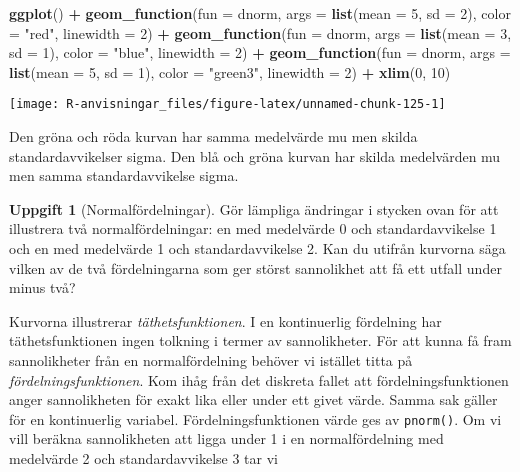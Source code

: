 \documentclass[
]{book}
\newenvironment{Shaded}{\begin{snugshade}}{\end{snugshade}}
\newcommand{\AttributeTok}[1]{\textcolor[rgb]{0.13,0.29,0.53}{#1}}
\newcommand{\DecValTok}[1]{\textcolor[rgb]{0.00,0.00,0.81}{#1}}
\newcommand{\FunctionTok}[1]{\textcolor[rgb]{0.13,0.29,0.53}{\textbf{#1}}}
\newcommand{\NormalTok}[1]{#1}
\newcommand{\SpecialCharTok}[1]{\textcolor[rgb]{0.81,0.36,0.00}{\textbf{#1}}}
\newcommand{\StringTok}[1]{\textcolor[rgb]{0.31,0.60,0.02}{#1}}
\theoremstyle{definition}
\theoremstyle{definition}
\theoremstyle{definition}
\newtheorem{exercise}{Uppgift}[chapter]
\theoremstyle{definition}
\theoremstyle{remark}
\begin{document}
\begin{Shaded}
\begin{Highlighting}[]
\FunctionTok{ggplot}\NormalTok{() }\SpecialCharTok{+}
  \FunctionTok{geom\_function}\NormalTok{(}\AttributeTok{fun =}\NormalTok{ dnorm, }\AttributeTok{args =} \FunctionTok{list}\NormalTok{(}\AttributeTok{mean =} \DecValTok{5}\NormalTok{, }\AttributeTok{sd =} \DecValTok{2}\NormalTok{), }\AttributeTok{color =} \StringTok{"red"}\NormalTok{, }\AttributeTok{linewidth =} \DecValTok{2}\NormalTok{) }\SpecialCharTok{+}
  \FunctionTok{geom\_function}\NormalTok{(}\AttributeTok{fun =}\NormalTok{ dnorm, }\AttributeTok{args =} \FunctionTok{list}\NormalTok{(}\AttributeTok{mean =} \DecValTok{3}\NormalTok{, }\AttributeTok{sd =} \DecValTok{1}\NormalTok{), }\AttributeTok{color =} \StringTok{"blue"}\NormalTok{, }\AttributeTok{linewidth =} \DecValTok{2}\NormalTok{) }\SpecialCharTok{+}
  \FunctionTok{geom\_function}\NormalTok{(}\AttributeTok{fun =}\NormalTok{ dnorm, }\AttributeTok{args =} \FunctionTok{list}\NormalTok{(}\AttributeTok{mean =} \DecValTok{5}\NormalTok{, }\AttributeTok{sd =} \DecValTok{1}\NormalTok{), }\AttributeTok{color =} \StringTok{"green3"}\NormalTok{, }\AttributeTok{linewidth =} \DecValTok{2}\NormalTok{) }\SpecialCharTok{+}
  \FunctionTok{xlim}\NormalTok{(}\DecValTok{0}\NormalTok{, }\DecValTok{10}\NormalTok{)}
\end{Highlighting}
\end{Shaded}

\begin{center}\texttt{[image: R-anvisningar\_files/figure-latex/unnamed-chunk-125-1]} \end{center}

Den gröna och röda kurvan har samma medelvärde mu men skilda standardavvikelser sigma. Den blå och gröna kurvan har skilda medelvärden mu men samma standardavvikelse sigma.

\begin{exercise}[Normalfördelningar]
Gör lämpliga ändringar i stycken ovan för att illustrera två normalfördelningar: en med medelvärde 0 och standardavvikelse 1 och en med medelvärde 1 och standardavvikelse 2. Kan du utifrån kurvorna säga vilken av de två fördelningarna som ger störst sannolikhet att få ett utfall under minus två?
\end{exercise}

Kurvorna illustrerar \emph{täthetsfunktionen}. I en kontinuerlig fördelning har täthetsfunktionen ingen tolkning i termer av sannolikheter. För att kunna få fram sannolikheter från en normalfördelning behöver vi istället titta på \emph{fördelningsfunktionen}. Kom ihåg från det diskreta fallet att fördelningsfunktionen anger sannolikheten för exakt lika eller under ett givet värde. Samma sak gäller för en kontinuerlig variabel. Fördelningsfunktionen värde ges av \texttt{pnorm()}. Om vi vill beräkna sannolikheten att ligga under 1 i en normalfördelning med medelvärde 2 och standardavvikelse 3 tar vi
\end{document}
